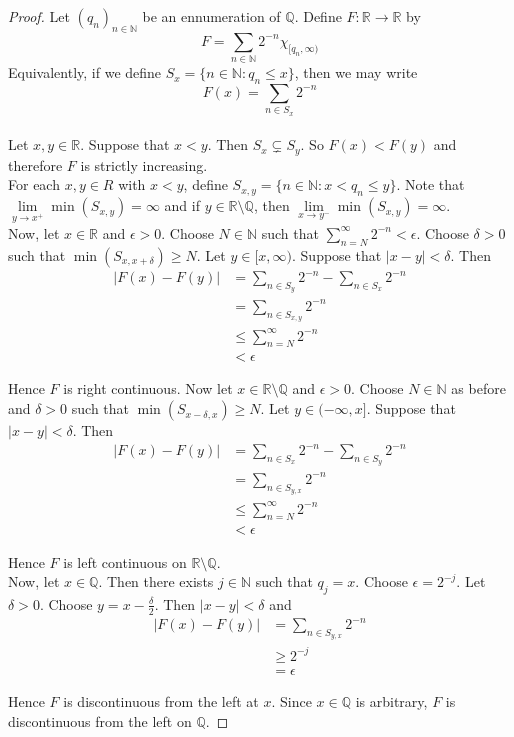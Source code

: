 \documentclass{book}
\theoremstyle{definition}
\newcommand{\del}{\delta}
\newcommand{\ep}{\epsilon}
\newcommand{\N}{\mathbb{N}}
\newcommand{\Q}{\mathbb{Q}}
\newcommand{\R}{\mathbb{R}}
\DeclareMathOperator*{\0}{\mbf{0}}
\DeclareMathOperator*{\1}{\mbf{1}}
\begin{document}
	\begin{proof}
		Let $(q_n)_{n\in \N}$ be an ennumeration of $\Q$. Define $F:\R \rightarrow \R$ by $$F =\sum_{n\in \N} 2^{-n}\chi_{[q_n, \infty)}$$ 
		Equivalently, if we define $S_x=\{n \in \N: q_n \leq x\}$, then we may write $$F(x) = \sum_{n \in S_x}2^{-n}$$\\ Let $x, y \in \R$. Suppose that $x < y$. Then $S_x \subsetneq S_y$. So $F(x)<F(y)$ and therefore $F$ is strictly increasing.\\ 
		For each $x,y \in R$ with $x<y$, define $S_{x,y}= \{n \in \N:x< q_n \leq y\}$. Note that $\lim\limits_{y\rightarrow x^+}\min(S_{x,y}) = \infty$ and if $y \in \R \setminus \Q$, then $\lim\limits_{x\rightarrow y^-}\min(S_{x,y}) = \infty$.\\
		Now, let $x \in \R$ and $\ep>0$. Choose $N \in \N$ such that $\sum\limits_{n = N}^{\infty}2^{-n}<\ep$. Choose $\del>0$ such that $\min (S_{x,x+\del}) \geq N$.  Let $y \in [x,\infty)$. Suppose that $|x-y| < \del$. Then 
		\begin{align*}
			|F(x)-F(y)| 
			&= \sum_{n \in S_y}2^{-n} - \sum_{n \in S_x}2^{-n}\\
			& = \sum_{n \in S_{x,y}}2^{-n}\\
			& \leq \sum_{n=N}^{\infty}2^{-n}\\
			&<\ep
		\end{align*} 
		
		Hence $F$ is right continuous. Now let $x \in \R\setminus \Q$ and $\ep>0$. Choose $N \in \N$ as before and $\del>0$ such that $\min(S_{x-\del,x})\geq N$. Let $y \in (-\infty, x]$. Suppose that $|x-y|<\del$. Then 
		\begin{align*}
			|F(x)-F(y)| 
			&= \sum_{n \in S_x}2^{-n} - \sum_{n \in S_y}2^{-n}\\
			& = \sum_{n \in S_{y,x}}2^{-n}\\
			& \leq \sum_{n=N}^{\infty}2^{-n}\\
			&<\ep
		\end{align*}
		
		Hence $F$ is left continuous on $\R\setminus \Q$.\\
		Now, let $x \in \Q$. Then there exists $j \in \N$ such that $q_j=x$. Choose $\ep=2^{-j}$. Let $\del>0$. Choose $y=x-\frac{\del}{2}$. Then $|x-y|< \del$ and 
		\begin{align*}
			|F(x)-F(y)|
			&= \sum_{n \in S_{y,x}}2^{-n}\\
			&\geq 2^{-j}\\
			&= \ep
		\end{align*}
		
		Hence $F$ is discontinuous from the left at $x$. Since $x \in \Q$ is arbitrary, $F$ is discontinuous from the left on $\Q$.  
	\end{proof}
	
\end{document}

